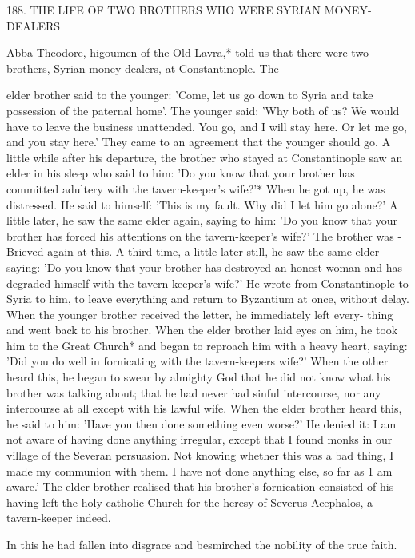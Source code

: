 188.
THE LIFE OF TWO BROTHERS
WHO WERE SYRIAN MONEY-DEALERS

Abba Theodore, higoumen of the Old Lavra,* told us that there
were two brothers, Syrian money-dealers, at Constantinople.
The

elder brother said to the younger: 'Come, let us go down to Syria
and take possession of the paternal home'.
The younger said: 'Why
both of us? We would have to leave the business unattended.
You
go, and I will stay here.
Or let me go, and you stay here.' They
came to an agreement that the younger should go.
A little while
after his departure, the brother who stayed at Constantinople saw
an elder in his sleep who said to him: 'Do you know that your
brother has committed adultery with the tavern-keeper's wife?'*
When he got up, he was distressed.
He said to himself: 'This is my
fault.
Why did I let him go alone?' A little later, he saw the same
elder again, saying to him: 'Do you know that your brother has
forced his attentions on the tavern-keeper's wife?' The brother was
-Brieved again at this.
A third time, a little later still, he saw the same
elder saying: 'Do you know that your brother has destroyed an
honest woman and has degraded himself with the tavern-keeper's
wife?' He wrote from Constantinople to Syria to him, to leave
everything and return to Byzantium at once, without delay.
When
the younger brother received the letter, he immediately left every-
thing and went back to his brother.
When the elder brother laid
eyes on him, he took him to the Great Church* and began to
reproach him with a heavy heart, saying: 'Did you do well in
fornicating with the tavern-keeper\textquotesingle s wife?' When the other heard
this, he began to swear by almighty God that he did not know what
his brother was talking about; that he had never had sinful
intercourse, nor any intercourse at all except with his lawful wife.
When the elder brother heard this, he said to him: 'Have you then
done something even worse?' He denied it: I am not aware of
having done anything irregular, except that I found monks in our
village of the Severan persuasion.
Not knowing whether this was a
bad thing, I made my communion with them.
I have not done
anything else, so far as 1 am aware.' The elder brother realised that
his brother's fornication consisted of his having left the holy catholic
Church for the heresy of Severus Acephalos, a tavern-keeper indeed.

In this he had fallen into disgrace and besmirched the nobility of the
true faith.

